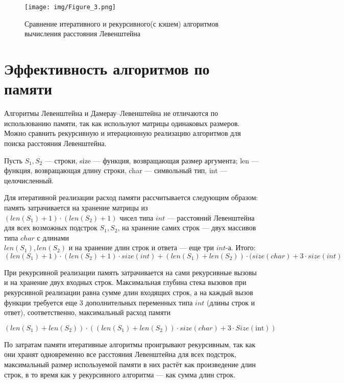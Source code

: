 \documentclass[a4paper,14pt, unknownkeysallowed]{extreport}
\begin{document}
\begin{figure}[h]
	\centering
	\texttt{[image: img/Figure\_3.png]}
	\caption{Сравнение итеративного и рекурсивного(с кэшем) алгоритмов вычисления расстояния Левенштейна}
	\label{fig:DL_table}
\end{figure}

\clearpage

\section{Эффективность алгоритмов по памяти}

Алгоритмы Левенштейна и Дамерау--Левенштейна не отличаются по использованию памяти, так как используют матрицы одинаковых размеров. Можно сравнить рекурсивную и итерационную реализацию алгоритмов для поиска расстояния Левенштейна.

Пусть $S_{1}, S_{2}$ --- строки, size --- функция, возвращающая размер аргумента; len --- функция, возвращающая длину строки, char --- символьный тип, int --- целочисленный.

Для итеративной реализации расход памяти рассчитывается следующим образом: память затрачивается на хранение матрицы из $(len(S_{1}) + 1) \cdot (len(S_{2}) + 1)$ чисел типа $int$ --- расстояний Левенштейна для всех возможных подстрок $S_{1}, S_{2}$, на хранение самих строк --- двух массивов типа $char$ с длинами\\ $len(S_{1}), len(S_{2})$ и на хранение длин строк и ответа --- еще три $int$-а.
Итого:
\begin{equation}
	(len(S_{1}) + 1) \cdot (len(S_{2}) + 1) \cdot size(int)  + (len(S_{1}) + len(S_{2})) \cdot (size(char) + 3 \cdot size(int)
\end{equation}

При рекурсивной реализации память затрачивается на сами рекурсивные вызовы и на хранение двух входных строк.
Максимальная глубина стека вызовов при рекурсивной реализации равна сумме длин входящих строк, а на каждый вызов функции требуется еще 3 дополнительных переменных типа $int$ (длины строк и ответ), соответственно, максимальный расход памяти

\begin{equation}
	(len(S_{1}) + len(S_{2})) \cdot ((len(S_{1}) + len(S_{2})) \cdot size(char) + 3 \cdot Size(\text{int}))
\end{equation}

\noindent

По затратам памяти итеративные алгоритмы проигрывают рекурсивным, так как они хранят одновременно все расстояния Левенштейна для всех подстрок, максимальный размер используемой памяти в них растёт как произведение длин строк, в то время как у рекурсивного алгоритма — как сумма длин строк.
\end{document}
